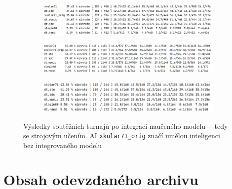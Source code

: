 \documentclass[11pt, a4paper]{article}
\theoremstyle{definition}
\begin{document}
\begin{figure}[H]
    \centering
    \begin{subfigure}{\textwidth}
        \centering
        \includegraphics[width=\linewidth]{tournament-nn-1.png}
        \vspace{0mm}
    \end{subfigure}
    \begin{subfigure}{\textwidth}
        \centering
        \includegraphics[width=\linewidth]{tournament-nn-2.png}
        \vspace{0mm}
    \end{subfigure}
    \begin{subfigure}{\textwidth}
        \centering
        \includegraphics[width=\linewidth]{tournament-nn-3.png}
    \end{subfigure}
    \caption{Výsledky soutěžních turnajů po integraci naučeného modelu\,---\,tedy se strojovým učením.
    AI \texttt{xkolar71\_orig} značí umělou inteligenci bez integrovaného modelu}
    \label{fig:vysledky-turnaje-s-modelem}
\end{figure}


\section{Obsah odevzdaného archivu}
\label{sec:files}
\end{document}
